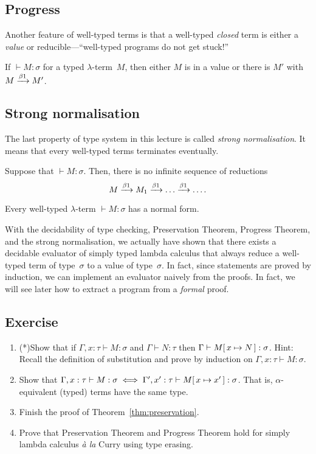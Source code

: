 \subsection{Progress}
Another feature of well-typed terms is that a well-typed \emph{closed} term is
either a \emph{value} or reducible---``well-typed programs do not get stuck!''

\begin{theorem}
  If ${}\vdash M : \sigma$ for a typed $\lambda$-term~$M$, then either $M$ is in
  a value or there is $M'$ with $M \xrightarrow{\beta1} M'$.
\end{theorem}

\subsection{Strong normalisation}
The last property of type system in this lecture is called \emph{strong
  normalisation}. It means that every well-typed terms terminates eventually. 
\begin{theorem}
  Suppose that ${}\vdash M : \sigma$. Then,
  there is no infinite sequence of reductions
  \[
    M \xrightarrow{\beta1} M_1 \xrightarrow{\beta1} \dots \xrightarrow{\beta1} \dots.
  \]
\end{theorem}
\begin{corollary}
  Every well-typed $\lambda$-term ${}\vdash M:\sigma$ has a normal form.
\end{corollary}
With the decidability of type checking, Preservation Theorem, Progress Theorem,
and the strong normalisation, we actually have shown that there exists a
decidable evaluator of simply typed lambda calculus that always reduce a
well-typed term of type~$\sigma$ to a value of type~$\sigma$. In fact, since
statements are proved by induction, we can implement an evaluator naively from
the proofs. In fact, we will see later how to extract a program from a
\emph{formal} proof.
\subsection*{Exercise}
\begin{enumerate}
  \item (*)Show that if $\Gamma, x : \tau \vdash M : \sigma$
    and $\Gamma \vdash N : \tau$ then $\Gamma \vdash M[\,x\mapsto N\,] : \sigma$.
    Hint: Recall the definition of substitution and prove by induction
    on $\Gamma, x:\tau\vdash M : \sigma$.
  \item Show that $\Gamma, x : \tau \vdash M :\sigma
    \iff \Gamma', x' : \tau \vdash M[\,x\mapsto x'\,] : \sigma$. That is,
    $\alpha$-equivalent (typed) terms have the same type.
  \item Finish the proof of Theorem~\ref{thm:preservation}.
  \item Prove that Preservation Theorem and Progress Theorem hold for
    simply lambda calculus \textit{\`a la} Curry using type erasing.
\end{enumerate}
